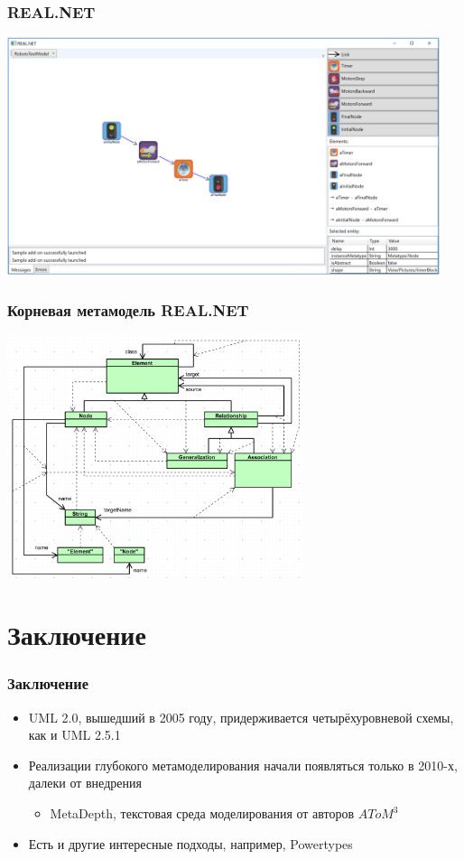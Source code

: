 \documentclass[xetex,mathserif,serif]{beamer}
\begin{document}
	\begin{frame}
		\frametitle{REAL.NET}
		\begin{center}
			\includegraphics[width=0.95\textwidth]{realNet.png}
		\end{center}
	\end{frame}

	\begin{frame}
		\frametitle{Корневая метамодель REAL.NET}
		\begin{center}
			\includegraphics[width=0.65\textwidth]{realNetMetametamodel.png}
		\end{center}
	\end{frame}

	\section{Заключение}

	\begin{frame}
		\frametitle{Заключение}
		\begin{itemize}
			\item UML 2.0, вышедший в 2005 году, придерживается четырёхуровневой схемы, как и UML 2.5.1
			\item Реализации глубокого метамоделирования начали появляться только в 2010-х, далеки от внедрения
			\begin{itemize}
				\item MetaDepth, текстовая среда моделирования от авторов $AToM^3$
			\end{itemize}
			\item Есть и другие интересные подходы, например, Powertypes
		\end{itemize}
	\end{frame}
\end{document}
